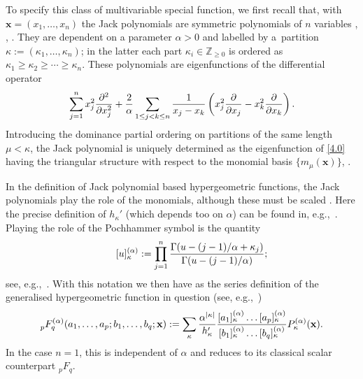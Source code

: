 \documentclass[pdftex]{sigma}
\numberwithin{equation}{section}
\theoremstyle{definition}
\begin{document}
To specify this class of multivariable special function, we first recall that, with $\mathbf x = (x_1,\dots,\allowbreak x_n)$
the Jack polynomials  are symmetric polynomials of $n$ variables \cite[Chapter~VI.6]{Ma95}, \cite[Chapter~12]{Fo10}, \cite[Chapter~7]{KK09}.
 They are dependent on
 a parameter $\alpha > 0$ and
 labelled by a~partition $\kappa :=
 (\kappa_1,\dots,\kappa_n)$; in the latter
 each part $\kappa_i \in \mathbb Z_{\ge 0}$ is ordered as $\kappa_1 \ge \kappa_2 \ge \cdots \ge \kappa_n$. These polynomials are eigenfunctions of
 the
differential operator
\begin{equation}\label{4.0}
\sum_{j=1}^n
x_j^2 {\partial^2 \over \partial x_j^2}
+ {2 \over \alpha} \sum_{1 \le j < k \le n}{1 \over x_j -
x_k}
\left (x_j^2 {\partial \over \partial x_j} - x_k^2 {\partial
\over
\partial x_k}
\right ).
\end{equation}
 Introducing the dominance partial ordering on partitions of the same length
 $\mu < \kappa$, the Jack polynomial
 is uniquely determined as the eigenfunction of \eqref{4.0} having
the triangular structure with respect to the monomial basis $\{ m_\mu(\mathbf x) \}$,
.

In the definition of Jack polynomial based hypergeometric functions, the Jack polynomials play the role of the monomials, although these must be scaled
.
{Here} the precise definition of $h_\kappa'$
(which depends too on $\alpha$) can be found in, e.g.,~\cite[equation~(12.46)]{Fo10}.
Playing the role of the Pochhammer symbol is the quantity
 \[%
\qquad[u]_\kappa^{(\alpha)} := \prod_{j=1}^n {\Gamma(u - (j-1)/\alpha + \kappa_j) \over \Gamma(u - (j - 1)/\alpha)};
\]
see, e.g.,~\cite[equation~(12.46)]{Fo10}. With this notation we then have as the series definition of the generalised hypergeometric function in question (see, e.g.,~\cite[Section~13.1]{Fo10})
\[%
 {\vphantom{F}}_p^{\mathstrut} F_q^{(\alpha)}(a_1,\dots,a_p;b_1,\dots,b_q; \mathbf x):=\sum_\kappa {\alpha^{| \kappa |} \over h_\kappa'}
 \frac{[a_1]^{(\alpha)}_\kappa\dots [a_p]^{(\alpha)}_\kappa }{[b_1]^{(\alpha)}_\kappa
\dots [b_q]^{(\alpha)}_\kappa}
P_\kappa^{(\alpha)}(\mathbf x).
\]
In the case $n=1$, this is independent of $\alpha$ and reduces to its classical scalar counterpart ${}_pF_q$.
\end{document}
